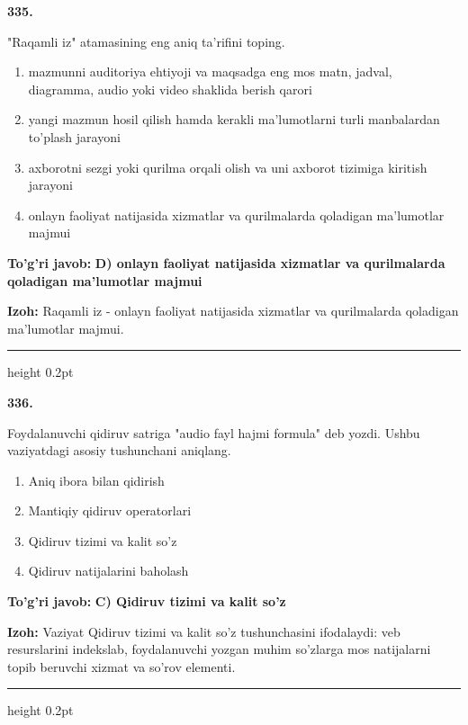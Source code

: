 \documentclass[10pt,a4paper,oneside]{article}
\begin{document}
\noindent\textbf{\color{ink}335.}
\par
"Raqamli iz" atamasining eng aniq ta'rifini toping.
\begin{enumerate}[label=\Alph*),leftmargin=9mm]
\item mazmunni auditoriya ehtiyoji va maqsadga eng mos matn, jadval, diagramma, audio yoki video shaklida berish qarori
\item yangi mazmun hosil qilish hamda kerakli ma'lumotlarni turli manbalardan to'plash jarayoni
\item axborotni sezgi yoki qurilma orqali olish va uni axborot tizimiga kiritish jarayoni
\item onlayn faoliyat natijasida xizmatlar va qurilmalarda qoladigan ma'lumotlar majmui
\end{enumerate}
\begin{tcolorbox}[enhanced,breakable,colback=teal!4,colframe=teal!50!black,boxrule=0.5pt,arc=1.1mm,left=3mm,right=3mm,top=1.7mm,bottom=1.7mm,before skip=2mm,after skip=2mm]
\textbf{\color{teal}To'g'ri javob:} \textbf{D) onlayn faoliyat natijasida xizmatlar va qurilmalarda qoladigan ma'lumotlar majmui}
\par\smallskip
\textbf{Izoh:} Raqamli iz - onlayn faoliyat natijasida xizmatlar va qurilmalarda qoladigan ma'lumotlar majmui.
\end{tcolorbox}
\vspace{2mm}\hrule height 0.2pt \vspace{3mm}

\noindent\textbf{\color{ink}336.}
\par
Foydalanuvchi qidiruv satriga "audio fayl hajmi formula" deb yozdi. Ushbu vaziyatdagi asosiy tushunchani aniqlang.
\begin{enumerate}[label=\Alph*),leftmargin=9mm]
\item Aniq ibora bilan qidirish
\item Mantiqiy qidiruv operatorlari
\item Qidiruv tizimi va kalit so'z
\item Qidiruv natijalarini baholash
\end{enumerate}
\begin{tcolorbox}[enhanced,breakable,colback=teal!4,colframe=teal!50!black,boxrule=0.5pt,arc=1.1mm,left=3mm,right=3mm,top=1.7mm,bottom=1.7mm,before skip=2mm,after skip=2mm]
\textbf{\color{teal}To'g'ri javob:} \textbf{C) Qidiruv tizimi va kalit so'z}
\par\smallskip
\textbf{Izoh:} Vaziyat Qidiruv tizimi va kalit so'z tushunchasini ifodalaydi: veb resurslarini indekslab, foydalanuvchi yozgan muhim so'zlarga mos natijalarni topib beruvchi xizmat va so'rov elementi.
\end{tcolorbox}
\vspace{2mm}\hrule height 0.2pt \vspace{3mm}
\end{document}
